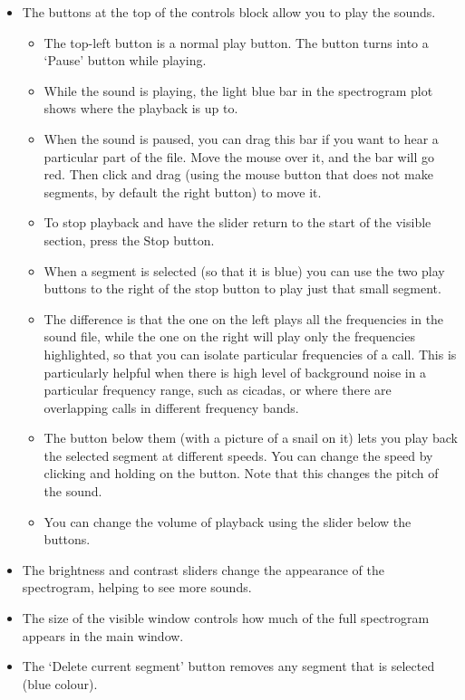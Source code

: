 \documentclass{article}
\begin{document}
\begin{itemize}
\item The buttons at the top of the controls block allow you to play the sounds. 

\begin{itemize}
\item The top-left button is a normal play button. The button turns into a `Pause' button while playing.  
\item While the sound is playing, the light blue bar in the spectrogram plot shows where the playback is up to. 
\item When the sound is paused, you can drag this bar if you want to hear a particular part of the file. Move the mouse over it, and the bar will go red. Then click and drag (using the mouse button that does not make segments, by default the right button) to move it. 
\item To stop playback and have the slider return to the start of the visible section, press the Stop button.
\item When a segment is selected (so that it is blue) you can use the two play buttons to the right of the stop button to play just that small segment. 
\item The difference is that the one on the left plays all the frequencies in the sound file, while the one on the right will play only the frequencies highlighted, so that you can isolate particular frequencies of a call. This is particularly helpful when there is high level of background noise in a particular frequency range, such as cicadas, or where there are overlapping calls in different frequency bands.
\item The button below them (with a picture of a snail on it) lets you play back the selected segment at different speeds. You can change the speed by clicking and holding on the button. Note that this changes the pitch of the sound.
\item You can change the volume of playback using the slider below the buttons. 
\end{itemize}

\item The brightness and contrast sliders change the appearance of the spectrogram, helping to see more sounds. 
\item The size of the visible window controls how much of the full spectrogram appears in the main window.
\item The `Delete current segment' button removes any segment that is selected (blue colour). 
\end{itemize}
\end{document}
